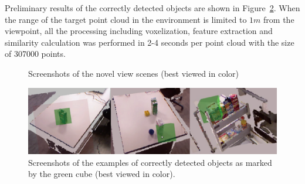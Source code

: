 \documentclass[conference]{sty/IEEEtran}
\begin{document}
Preliminary results of the correctly detected objects are shown in Figure~\ref{fig:correct_detected}. 
When the range of the target point cloud in the environment is limited to $1m$ from the viewpoint, 
all the processing including voxelization, feature extraction and similarity calculation was performed 
in 2-4 seconds per point cloud with the size of 307000 points.


\begin{figure}[htb!]
  \centering
 \caption{Screenshots of the novel view scenes (best viewed in color)}
 \label{fig:novel_views}
\end{figure}

\begin{figure}[htb!]
  \centering
  \includegraphics[width=.97\textwidth]{figures/detection_demo/correct_detected.png}
  \caption{Screenshots of the examples of correctly detected objects as marked by the green cube (best viewed in color).}
  \label{fig:correct_detected}
\end{figure}
\end{document}
